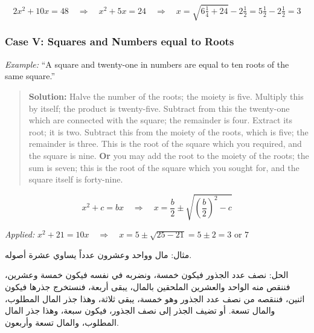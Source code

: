 \documentclass[11pt,a4paper,openany,oneside]{book}
\begin{document}
\begin{equation}
2x^2 + 10x = 48 \quad\Rightarrow\quad x^2 + 5x = 24 \quad\Rightarrow\quad
x = \sqrt{6\tfrac{1}{4} + 24} - 2\tfrac{1}{2} = 5\tfrac{1}{2} - 2\tfrac{1}{2} = 3
\end{equation}

\subsubsection*{Case V: Squares and Numbers equal to Roots}

\textit{Example:} ``A square and twenty-one in numbers are equal to ten roots
of the same square.''

\begin{quote}
\textbf{Solution:} Halve the number of the roots; the moiety is five.
Multiply this by itself; the product is twenty-five. Subtract from this the
twenty-one which are connected with the square; the remainder is four.
Extract its root; it is two. Subtract this from the moiety of the roots,
which is five; the remainder is three. This is the root of the square which
you required, and the square is nine. \textbf{Or} you may add the root to the
moiety of the roots; the sum is seven; this is the root of the square which
you sought for, and the square itself is forty-nine.
\end{quote}

\begin{mathbox}[title={\textbf{The Algorithm for Case V}}]
\begin{equation}
x^2 + c = bx \quad\Longrightarrow\quad x = \frac{b}{2} \pm \sqrt{\left(\frac{b}{2}\right)^2 - c}
\end{equation}

\textit{Applied:} $x^2 + 21 = 10x \quad\Rightarrow\quad x = 5 \pm \sqrt{25 - 21} = 5 \pm 2 = 3 \text{ or } 7$
\end{mathbox}

\begin{arabicbox}
\begin{Arabic}
مثال: مال وواحد وعشرون عدداً يساوي عشرة أصوله.

الحل: نصف عدد الجذور فيكون خمسة، ونضربه في نفسه فيكون
خمسة وعشرين، فننقص منه الواحد والعشرين الملحقين بالمال،
يبقى أربعة، فنستخرج جذرها فيكون اثنين، فننقصه من نصف عدد
الجذور وهو خمسة، يبقى ثلاثة، وهذا جذر المال المطلوب، والمال
تسعة. أو تضيف الجذر إلى نصف الجذور، فيكون سبعة، وهذا جذر
المال المطلوب، والمال تسعة وأربعون.
\end{Arabic}
\end{arabicbox}
\end{document}
